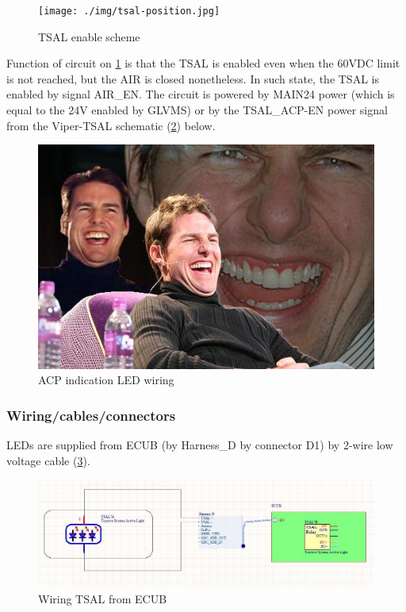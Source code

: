 \begin{figure}[H]
	\centering
	\texttt{[image: ./img/tsal-position.jpg]}
	\caption{TSAL enable scheme}
	\label{fig:TSAL-enable}
\end{figure}

Function of circuit on \ref{fig:TSAL-enable} is that the TSAL is enabled even when the 60VDC limit is not reached, but the AIR is closed nonetheless. In such state, the TSAL is enabled by signal AIR\_EN. The circuit is powered by MAIN24 power (which is equal to the 24V enabled by GLVMS) or by the TSAL\_ACP-EN power signal from the Viper-TSAL schematic (\ref{fig:TSAL-ACPindicator}) below.

\begin{figure}[H]
	\centering
	\includegraphics[width=\textwidth]{./img/tsal-indicator.jpg}
	\caption{ACP indication LED wiring}
	\label{fig:TSAL-ACPindicator}
\end{figure}

\subsubsection{Wiring/cables/connectors}

LEDs are supplied from ECUB (by Harness\_D by connector D1) by 2-wire low voltage cable (\ref{fig:TSAL-wiring}).

\begin{figure}[H]
	\centering
	\includegraphics[width=\textwidth,]{./img/tsal-wiring.jpg}
	\caption{Wiring TSAL from ECUB}
	\label{fig:TSAL-wiring}
\end{figure}

